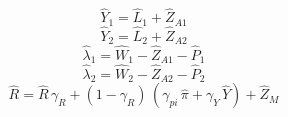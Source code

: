 \begin{dmath}
{{\hat{Y}_{1}}}={{\hat{L}_{1}}}+{{\hat{Z}_{A1}}}
\end{dmath}
\begin{dmath}
{{\hat{Y}_{2}}}={{\hat{L}_{2}}}+{{\hat{Z}_{A2}}}
\end{dmath}
\begin{dmath}
{{\hat{\lambda}_{1}}}={{\hat{W}_{1}}}-{{\hat{Z}_{A1}}}-{{\hat{P}_{1}}}
\end{dmath}
\begin{dmath}
{{\hat{\lambda}_{2}}}={{\hat{W}_{2}}}-{{\hat{Z}_{A2}}}-{{\hat{P}_{2}}}
\end{dmath}
\begin{dmath}
{{\hat{R}}}={{\hat{R}}}\, {{\gamma_{R}}}+\left(1-{{\gamma_{R}}}\right)\, \left({{\gamma_{pi}}}\, {{\hat{\pi}}}+{{\gamma_{Y}}}\, {{\hat{Y}}}\right)+{{\hat{Z}_M}}
\end{dmath}
